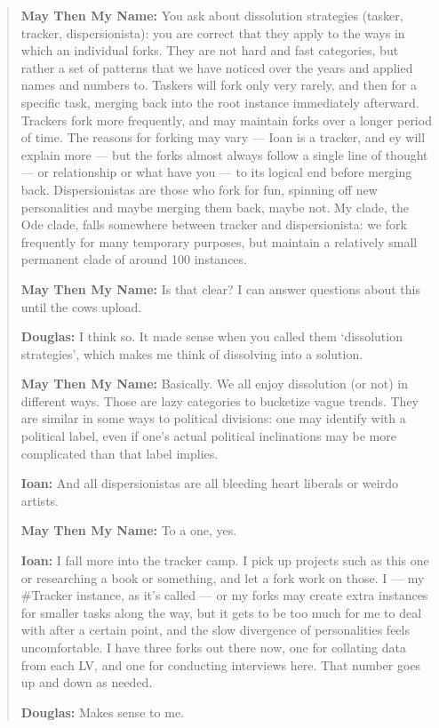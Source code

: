 \begin{quote}
\textbf{May Then My Name:} You ask about dissolution strategies (tasker, tracker, dispersionista): you are correct that they apply to the ways in which an individual forks. They are not hard and fast categories, but rather a set of patterns that we have noticed over the years and applied names and numbers to. Taskers will fork only very rarely, and then for a specific task, merging back into the root instance immediately afterward. Trackers fork more frequently, and may maintain forks over a longer period of time. The reasons for forking may vary — Ioan is a tracker, and ey will explain more — but the forks almost always follow a single line of thought — or relationship or what have you — to its logical end before merging back. Dispersionistas are those who fork for fun, spinning off new personalities and maybe merging them back, maybe not. My clade, the Ode clade, falls somewhere between tracker and dispersionista: we fork frequently for many temporary purposes, but maintain a relatively small permanent clade of around 100 instances.

\textbf{May Then My Name:} Is that clear? I can answer questions about this until the cows upload.

\textbf{Douglas:} I think so. It made sense when you called them `dissolution strategies', which makes me think of dissolving into a solution.

\textbf{May Then My Name:} Basically. We all enjoy dissolution (or not) in different ways. Those are lazy categories to bucketize vague trends. They are similar in some ways to political divisions: one may identify with a political label, even if one's actual political inclinations may be more complicated than that label implies.

\textbf{Ioan:} And all dispersionistas are all bleeding heart liberals or weirdo artists.

\textbf{May Then My Name:} To a one, yes.

\textbf{Ioan:} I fall more into the tracker camp. I pick up projects such as this one or researching a book or something, and let a fork work on those. I — my \#Tracker instance, as it's called — or my forks may create extra instances for smaller tasks along the way, but it gets to be too much for me to deal with after a certain point, and the slow divergence of personalities feels uncomfortable. I have three forks out there now, one for collating data from each LV, and one for conducting interviews here. That number goes up and down as needed.

\textbf{Douglas:} Makes sense to me.


\end{quote}

